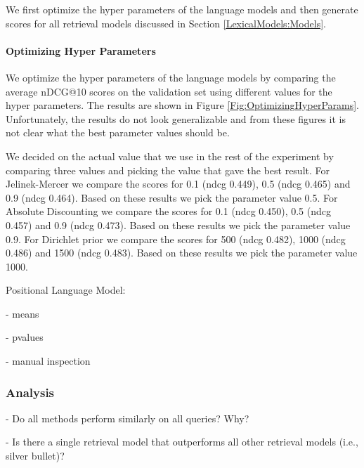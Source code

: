 We first optimize the hyper parameters of the 
language models and then generate scores for
all retrieval models discussed in 
Section \ref{LexicalModels:Models}.

\paragraph{Optimizing Hyper Parameters}

We optimize the hyper parameters of the language models
by comparing the average nDCG@10 scores on the validation set 
using different values for the hyper parameters.
The results are shown in Figure \ref{Fig:OptimizingHyperParams}.
Unfortunately, the results do not look generalizable and 
from these figures it is not clear what 
the best parameter values should be. 



We decided on the actual value that we use in the rest of the experiment
by comparing three values and picking the value that gave the best result.
%
For Jelinek-Mercer we compare the scores for 0.1 (ndcg 0.449),
0.5 (ndcg 0.465) and 0.9 (ndcg 0.464). Based on these results we pick
the parameter value 0.5. 
%
For Absolute Discounting we compare the scores for 0.1 (ndcg 0.450),
0.5 (ndcg 0.457) and 0.9 (ndcg 0.473). Based on these results we pick
the parameter value 0.9. 
%
For Dirichlet prior we compare the scores for 500 (ndcg 0.482),
1000 (ndcg 0.486) and 1500 (ndcg 0.483). Based on these results we pick
the parameter value 1000. 




Positional Language Model:




- means



- pvalues

- manual inspection

\subsubsection{Analysis}
\label{AnalysisLexicalModels}



- Do all methods perform similarly on all queries? Why?

- Is there a single retrieval model that outperforms all other retrieval models (i.e., silver bullet)?